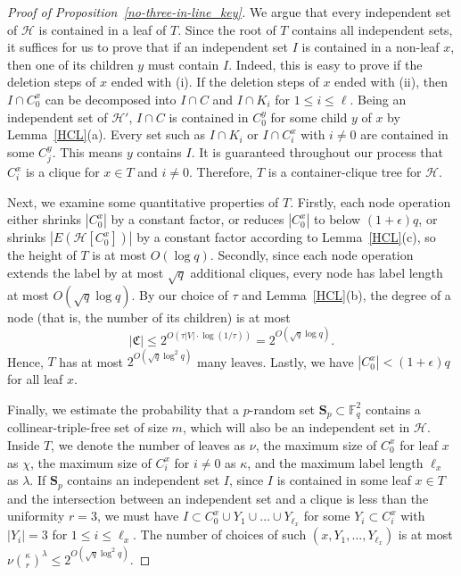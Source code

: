 \documentclass[11pt]{article}
\theoremstyle{definition}
\begin{document}
\begin{proof}[Proof of Proposition~\ref{no-three-in-line_key}]
    We argue that every independent set of $\mathcal{H}$ is contained in a leaf of $T$. Since the root of $T$ contains all independent sets, it suffices for us to prove that if an independent set $I$ is contained in a non-leaf $x$, then one of its children $y$ must contain $I$. Indeed, this is easy to prove if the deletion steps of $x$ ended with (i). If the deletion steps of $x$ ended with (ii), then $I\cap C^x_0$ can be decomposed into $I\cap C$ and $I\cap K_i$ for $1\leq i \leq \ell$. Being an independent set of $\mathcal{H}'$, $I\cap C$ is contained in $C^y_0$ for some child $y$ of $x$ by Lemma~\ref{HCL}(a). Every set such as $I\cap K_i$ or $I\cap C^x_i$ with $i\neq 0$ are contained in some $C^y_j$. This means $y$ contains $I$. It is guaranteed throughout our process that $C^x_i$ is a clique for $x \in T$ and $i\neq 0$. Therefore, $T$ is a container-clique tree for $\mathcal{H}$.
    
    Next, we examine some quantitative properties of $T$. Firstly, each node operation either shrinks $|C^x_0|$ by a constant factor, or reduces $|C^x_0|$ to below $(1+\epsilon)q$, or shrinks $|E(\mathcal{H}[C^x_0])|$ by a constant factor according to Lemma~\ref{HCL}(c), so the height of $T$ is at most $O(\log q)$. Secondly, since each node operation extends the label by at most $\sqrt{q}$ additional cliques, every node has label length at most $O(\sqrt{q}\log q)$. By our choice of $\tau$ and Lemma~\ref{HCL}(b), the degree of a node (that is, the number of its children) is at most \begin{equation*}
         |\mathfrak{C}| \leq 2^{O\left(\tau |V| \cdot \log(1/\tau)\right)} = 2^{O\left(\sqrt{q}\log q\right)}.
    \end{equation*} Hence, $T$ has at most $2^{O\left(\sqrt{q}\log^2 q\right)}$ many leaves. Lastly, we have $|C^x_0| < (1+\epsilon)q$ for all leaf $x$.

    Finally, we estimate the probability that a $p$-random set $\mathbf{S}_p \subset \mathbb{F}_q^2$ contains a collinear-triple-free set of size $m$, which will also be an independent set in $\mathcal{H}$. Inside $T$, we denote the number of leaves as $\nu$, the maximum size of $C^x_0$ for leaf $x$ as $\chi$, the maximum size of $C^x_i$ for $i\neq 0$ as $\kappa$, and the maximum label length $\ell_x$ as $\lambda$. If $\mathbf{S}_p$ contains an independent set $I$, since $I$ is contained in some leaf $x \in T$ and the intersection between an independent set and a clique is less than the uniformity $r = 3$, we must have $I \subset C^x_0\cup Y_1\cup \dots\cup Y_{\ell_x}$ for some $Y_i \subset C^x_i$  with $|Y_i| = 3$ for $1\leq i\leq \ell_x$. The number of choices of such $(x,Y_1,\dots,Y_{\ell_x})$ is at most $\nu\binom{\kappa}{r}^{\lambda}\leq 2^{O\left(\sqrt{q}\log^2 q\right)}$.
    

\end{proof}
\end{document}
